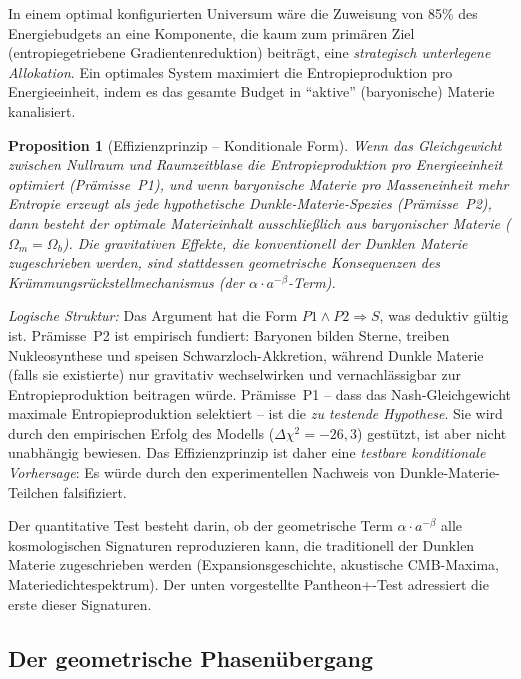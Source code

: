 \documentclass[aps,prd,twocolumn,superscriptaddress,nofootinbib]{revtex4-2}
\newtheorem{proposition}{Proposition}
\begin{document}
In einem optimal konfigurierten Universum w\"are die Zuweisung von 85\% des Energiebudgets an eine Komponente, die kaum zum prim\"aren Ziel (entropiegetriebene Gradientenreduktion) beitr\"agt, eine \textit{strategisch unterlegene Allokation}. Ein optimales System maximiert die Entropieproduktion pro Energieeinheit, indem es das gesamte Budget in "`aktive"' (baryonische) Materie kanalisiert.

\begin{proposition}[Effizienzprinzip -- Konditionale Form]
\textit{Wenn} das Gleichgewicht zwischen Nullraum und Raumzeitblase die Entropieproduktion pro Energieeinheit optimiert (Pr\"amisse~P1), und \textit{wenn} baryonische Materie pro Masseneinheit mehr Entropie erzeugt als jede hypothetische Dunkle-Materie-Spezies (Pr\"amisse~P2), \textit{dann} besteht der optimale Materieinhalt ausschließlich aus baryonischer Materie ($\Omega_m = \Omega_b$). Die gravitativen Effekte, die konventionell der Dunklen Materie zugeschrieben werden, sind stattdessen geometrische Konsequenzen des Kr\"ummungsr\"uckstellmechanismus (der $\alpha \cdot a^{-\beta}$-Term).
\end{proposition}

\textit{Logische Struktur:} Das Argument hat die Form $P1 \wedge P2 \Rightarrow S$, was deduktiv g\"ultig ist. Pr\"amisse~P2 ist empirisch fundiert: Baryonen bilden Sterne, treiben Nukleosynthese und speisen Schwarzloch-Akkretion, w\"ahrend Dunkle Materie (falls sie existierte) nur gravitativ wechselwirken und vernachl\"assigbar zur Entropieproduktion beitragen w\"urde. Pr\"amisse~P1 -- dass das Nash-Gleichgewicht maximale Entropieproduktion selektiert -- ist die \textit{zu testende Hypothese}. Sie wird durch den empirischen Erfolg des Modells ($\Delta\chi^2 = -26{,}3$) gest\"utzt, ist aber nicht unabh\"angig bewiesen. Das Effizienzprinzip ist daher eine \textit{testbare konditionale Vorhersage}: Es w\"urde durch den experimentellen Nachweis von Dunkle-Materie-Teilchen falsifiziert.

Der quantitative Test besteht darin, ob der geometrische Term $\alpha \cdot a^{-\beta}$ alle kosmologischen Signaturen reproduzieren kann, die traditionell der Dunklen Materie zugeschrieben werden (Expansionsgeschichte, akustische CMB-Maxima, Materiedichtespektrum). Der unten vorgestellte Pantheon+-Test adressiert die erste dieser Signaturen.

\subsection{Der geometrische Phasen\"ubergang}
\label{subsec:phase_transition}
\end{document}
